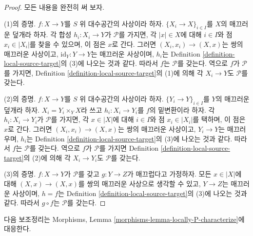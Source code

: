 \begin{proof}
모든 내용을 완전히 써 보자.

\medskip\noindent
(1)의 증명. $f:X\to Y$를 $S$ 위 대수공간의 사상이라 하자.
$\{X_i\to X\}_{i\in I}$를 $X$의 매끄러운 덮개라 하자. 각 합성
$h_i:X_i\to Y$가 $\mathcal{P}$를 가지면, 각 $|x|\in X$에 대해
$i\in I$와 점 $x_i\in|X_i|$를 찾을 수 있으며, 이 점은 $x$로 간다. 그러면
$(X_i,x_i)\to(X,x)$는 쌍의 매끄러운 사상이고,
$\text{id}_Y:Y\to Y$는 매끄러운 사상이며, $h_i$는 Definition
\ref{definition-local-source-target}의 (3)에 나오는 것과 같다. 따라서
$f$는 $\mathcal{P}$를 갖는다. 역으로 $f$가 $\mathcal{P}$를 가지면,
Definition \ref{definition-local-source-target}의 (1)에 의해 각
$X_i\to Y$도 $\mathcal{P}$를 갖는다.

\medskip\noindent
(2)의 증명. $f:X\to Y$를 $S$ 위 대수공간의 사상이라 하자.
$\{Y_i\to Y\}_{i\in I}$를 $Y$의 매끄러운 덮개라 하자.
$X_i=Y_i\times_YX$라 쓰고 $h_i:X_i\to Y_i$를 $f$의 밑변환이라 하자.
각 $h_i:X_i\to Y_i$가 $\mathcal{P}$를 가지면, 각 $x\in|X|$에 대해
$i\in I$와 점 $x_i\in|X_i|$를 택하며, 이 점은 $x$로 간다. 그러면
$(X_i,x_i)\to(X,x)$는 쌍의 매끄러운 사상이고, $Y_i\to Y$는 매끄러우며,
$h_i$는 Definition \ref{definition-local-source-target}의 (3)에 나오는 것과
같다. 따라서 $f$는 $\mathcal{P}$를 갖는다. 역으로 $f$가
$\mathcal{P}$를 가지면 Definition \ref{definition-local-source-target}의
(2)에 의해 각 $X_i\to Y_i$도 $\mathcal{P}$를 갖는다.

\medskip\noindent
(3)의 증명. $f:X\to Y$가 $\mathcal{P}$를 갖고 $g:Y\to Z$가
매끄럽다고 가정하자. 모든 $x\in|X|$에 대해 $(X,x)\to(X,x)$를 쌍의
매끄러운 사상으로 생각할 수 있고, $Y\to Z$는 매끄러운 사상이며,
$h=f$는 Definition \ref{definition-local-source-target}의 (3)에 나오는 것과
같다. 따라서 $g\circ f$는 $\mathcal{P}$를 갖는다.
\end{proof}

\noindent
다음 보조정리는 Morphisms, Lemma
\ref{morphisms-lemma-locally-P-characterize}에 대응한다.


